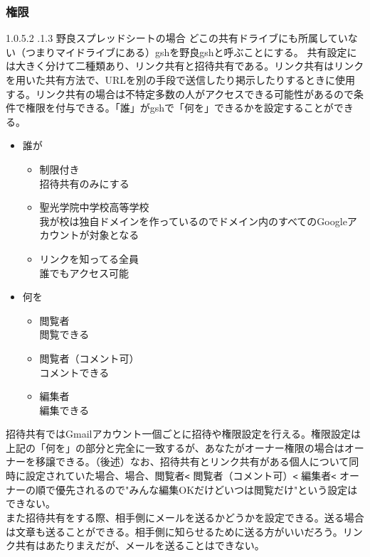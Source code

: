 \documentclass[dvipdfmx,jb5]{jarticle}
\makeatletter
\newcommand{\subsubsubsection}{\@startsection{paragraph}{4}{\z@}%
    {1.0\Cvs \@plus.5\Cdp \@minus.2\Cdp}%
    {.1\Cvs \@plus.3\Cdp}%
    {\large \bfseries}
  }
\makeatother
\begin{document}
  \subsubsection{権限}
  \subsubsubsection{野良スプレッドシートの場合}
  どこの共有ドライブにも所属していない（つまりマイドライブにある）gshを野良gshと呼ぶことにする。
 共有設定には大きく分けて二種類あり、リンク共有と招待共有である。リンク共有はリンクを用いた共有方法で、URLを別の手段で送信したり掲示したりするときに使用する。リンク共有の場合は不特定多数の人がアクセスできる可能性があるので条件で権限を付与できる。「誰」がgshで「何を」できるかを設定することができる。
 \begin{itemize}
 \item 誰が
 \begin{itemize}
 \item 制限付き\\
 招待共有のみにする
 \item 聖光学院中学校高等学校\\
 我が校は独自ドメインを作っているのでドメイン内のすべてのGoogleアカウントが対象となる
 \item リンクを知ってる全員\\
 誰でもアクセス可能
 \end{itemize}
 \item 何を
 \begin{itemize}
 \item 閲覧者\\
 閲覧できる
 \item 閲覧者（コメント可）\\
 コメントできる
 \item 編集者\\
 編集できる
 \end{itemize}
 \end{itemize}
 招待共有ではGmailアカウント一個ごとに招待や権限設定を行える。権限設定は上記の「何を」の部分と完全に一致するが、あなたがオーナー権限の場合はオーナーを移譲できる。（後述）なお、招待共有とリンク共有がある個人について同時に設定されていた場合、場合、閲覧者\verb|<| 閲覧者（コメント可）\verb|<| 編集者\verb|<| オーナーの順で優先されるので"みんな編集OKだけどいつは閲覧だけ"という設定はできない。
 \\
 
 また招待共有をする際、相手側にメールを送るかどうかを設定できる。送る場合は文章も送ることができる。相手側に知らせるために送る方がいいだろう。リンク共有はあたりまえだが、メールを送ることはできない。
 \\
 
\end{document}
